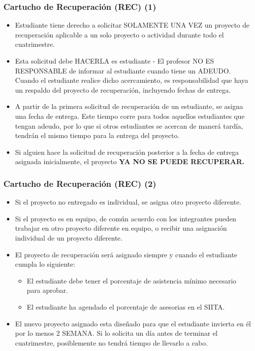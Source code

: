
\begin{frame}
\frametitle{Cartucho de Recuperación (REC) (1)}
\begin{itemize}
\item Estudiante tiene derecho a solicitar SOLAMENTE UNA VEZ un proyecto de recuperación aplicable a un solo proyecto o actividad durante todo el cuatrimestre. 
\item Esta solicitud debe HACERLA es estudiante - El profesor NO ES RESPONSABLE de informar al estudiante cuando tiene un ADEUDO. Cuando el estudiante realice dicho acercamiento, es responsabilidad que haya un respaldo del proyecto de recuperación, incluyendo fechas de entrega.
\item A partir de la primera solicitud de recuperación de un estudiante, se asigna una fecha de entrega. Este tiempo corre para todos aquellos estudiantes que tengan adeudo, por lo que si otros estudiantes se acercan de manerá tardía, tendrán el mismo tiempo para la entrega del proyecto.
\item Si alguien hace la solicitud de recuperación posterior a la fecha de entrega asignada inicialmente, el proyecto \textbf{YA NO SE PUEDE RECUPERAR.}
\end{itemize}
\end{frame}

\begin{frame}
\frametitle{Cartucho de Recuperación (REC) (2)}
\begin{itemize}
\item Si el proyecto no entregado es individual, se asigna otro proyecto diferente.
\item Si el proyecto es en equipo, de común acuerdo con los integrantes pueden trabajar en otro proyecto diferente en equipo, o recibir una asignación individual de un proyecto diferente.
\item El proyecto de recuperación será asignado siempre y cuando el estudiante cumpla lo siguiente:
\begin{itemize}
\item El estudiante debe tener el porcentaje de asistencia mínimo necesario para aprobar. 
\item El estudiante ha agendado el porcentaje de asesorias en el SIITA. 
\end{itemize}
\item El nuevo proyecto asignado esta diseñado para que el estudiante invierta en él por lo menos 2 SEMANA. Si lo solicita un día antes de terminar el cuatrimestre, posiblemente no tendrá tiempo de llevarlo a cabo. 

\end{itemize}
\end{frame}

